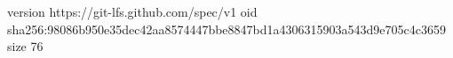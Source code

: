 version https://git-lfs.github.com/spec/v1
oid sha256:98086b950e35dec42aa8574447bbe8847bd1a4306315903a543d9e705c4c3659
size 76
